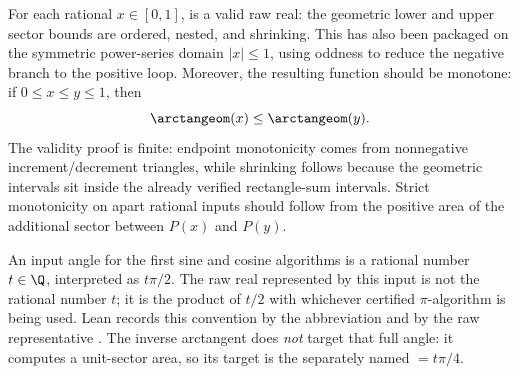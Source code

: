 \begin{theorem}
\label{thm:arctan-area-valid-monotone}
For each rational \(x\in[0,1]\),  is a valid raw real:
the geometric lower and upper sector bounds are ordered, nested, and shrinking.
This has also been packaged on the symmetric power-series domain \(|x|\le1\),
using oddness to reduce the negative branch to the positive loop.
Moreover, the resulting function should be monotone: if
\(0\le x\le y\le1\), then
\[
  \arctangeom(x)\le \arctangeom(y).
\]
The validity proof is finite: endpoint monotonicity comes from nonnegative
increment/decrement triangles, while shrinking follows because the geometric
intervals sit inside the already verified rectangle-sum intervals.  Strict
monotonicity on apart rational inputs should follow from the positive area of
the additional sector between \(P(x)\) and \(P(y)\).
\end{theorem}

\begin{definition}
\label{def:quarter-turn-angle}
An input angle for the first sine and cosine algorithms is a rational number
\(t\in\Q\), interpreted as \(t\pi/2\).  The raw real represented by this input is
not the rational number \(t\); it is the product of \(t/2\) with whichever
certified \(\pi\)-algorithm is being used.  Lean records this convention by the
abbreviation  and by the raw representative
.  The inverse arctangent does \emph{not} target that
full angle: it computes a unit-sector area, so its target is the separately
named \(=t\pi/4\).
\end{definition}

